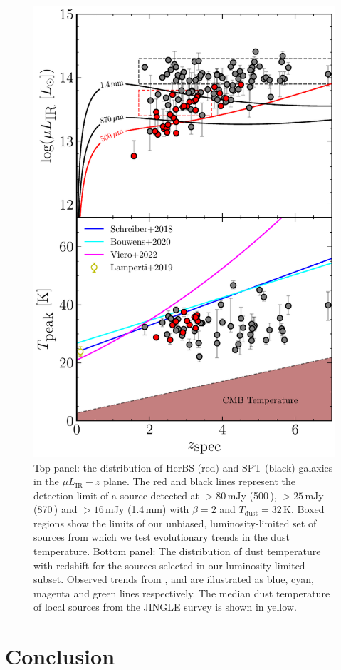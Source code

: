 \begin{figure}
	\centering
	\includegraphics[width=0.75\columnwidth]{Figures/t_evolution.pdf}
	\caption[Distribution of HerBS and SPT galaxies in the $L_{IR} - z$ and $T_\textrm{dust}-z$ planes]{Top panel: the distribution of HerBS (red) and SPT (black) galaxies in the $\mu L_{\textrm{IR}}-z$ plane. The red and black lines represent the detection limit of a source detected at $> 80$\,mJy (500\,\micron), $> 25$\,mJy (870\,\micron) and $> 16$\,mJy (1.4\,mm) with $\beta = 2$ and $T_{\textrm{dust}} = 32$\,K. Boxed regions show the limits of our unbiased, luminosity-limited set of sources from which we test evolutionary trends in the dust temperature. Bottom panel: The distribution of dust temperature with redshift for the sources selected in our luminosity-limited subset. Observed trends from \citealt{Schreiber_2018}, \citealt{Bouwens_2020} and \citealt{Viero_2022} are illustrated as blue, cyan, magenta and green lines respectively. The median dust temperature of local sources from the JINGLE survey is shown in yellow.}
	\label{fig:t_evolution}
\end{figure}

\section{Conclusion}

